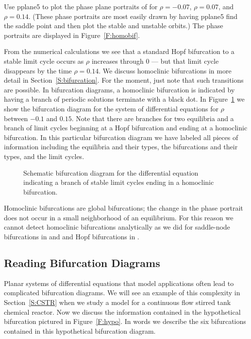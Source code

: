 Use {\sf pplane5} to plot the phase plane portraits of 
for $\rho=-0.07$, $\rho=0.07$, and $\rho=0.14$.  (These phase portraits 
are most easily drawn by having {\sf pplane5} find the saddle point and
then plot the stable and unstable orbits.)  The phase portraits are 
displayed in Figure~\ref{F:homobif}.  

From the numerical calculations we see that a standard Hopf bifurcation 
to a stable limit cycle occurs as $\rho$ 
increases through $0$ --- but that limit cycle disappears by the
time $\rho=0.14$.   We discuss homoclinic bifurcations in more detail 
in Section~\ref{S:bifurcation}.  For the moment, just note that such 
transitions are possible.  In bifurcation diagrams, a homoclinic 
bifurcation  is indicated by having a branch of periodic solutions
terminate with a black dot.  In Figure~\ref{F:homobifdiag} we show the 
bifurcation diagram for the system of differential equations 
 for $\rho$ between $-0.1$ and $0.15$.  Note that there
are branches for two equilibria and a 
branch of limit cycles 
beginning at a Hopf bifurcation and ending at a homoclinic bifurcation.
In this particular bifurcation diagram we have labeled all pieces
of information including the equilibria and their types, the 
bifurcations and their types, and the limit cycles.


\begin{figure}[htb]
           \centerline{%
           }
  \caption{Schematic bifurcation diagram for the differential equation
    \protect{} indicating a branch of stable limit cycles
        ending in a homoclinic bifurcation.}
           \label{F:homobifdiag}
\end{figure}

Homoclinic bifurcations are global bifurcations; the change in the phase 
portrait does not occur in a small neighborhood of an equilibrium.  For 
this reason we cannot detect homoclinic bifurcations analytically as we 
did for saddle-node bifurcations in  and  and Hopf bifurcations in .




\subsection*{Reading Bifurcation Diagrams}

Planar systems of differential equations that model applications often
lead to complicated bifurcation diagrams.  We will see an example
of this complexity in Section~\ref{S:CSTR} when we study a model for a 
continuous flow stirred tank chemical reactor.  
Now we discuss the information contained in the hypothetical bifurcation 
pictured in Figure~\ref{F:hypo}. In words we describe the six bifurcations
contained in this hypothetical bifurcation diagram. 

